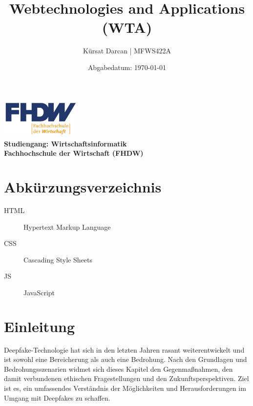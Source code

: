 \documentclass[a4paper,12pt]{article}
\title{\textbf{Webtechnologies and Applications (WTA)}}
\author{Kürsat Darcan | MFWS422A}
\date{Abgabedatum: \today}
\begin{document}
\maketitle
\thispagestyle{empty}
\vspace{2cm}
\begin{center}
    \includegraphics[width=0.3\textwidth]{FHDW_Logo_RGB-01.svg.png} %
    \\
    \vspace{1cm}
    \textbf{Studiengang: Wirtschaftsinformatik}\\
    \textbf{Fachhochschule der Wirtschaft (FHDW)}
\end{center}
\newpage

\renewcommand{\thepage}{\roman{page}} %
\tableofcontents
\newpage

\listoffigures
{}
\newpage

\listoftables
{}
\newpage

\section*{Abkürzungsverzeichnis}
\begin{description}
    \item[HTML] Hypertext Markup Language
    \item[CSS] Cascading Style Sheets
    \item[JS] JavaScript
\end{description}
\newpage

\renewcommand{\thepage}{\arabic{page}} %
\setcounter{page}{1}


\section{Einleitung}
Deepfake-Technologie hat sich in den letzten Jahren rasant weiterentwickelt und ist sowohl eine Bereicherung als auch eine Bedrohung. Nach den Grundlagen und Bedrohungsszenarien widmet sich dieses Kapitel den Gegenmaßnahmen, den damit verbundenen ethischen Fragestellungen und den Zukunftsperspektiven. Ziel ist es, ein umfassendes Verständnis der Möglichkeiten und Herausforderungen im Umgang mit Deepfakes zu schaffen.
\newpage
\end{document}
